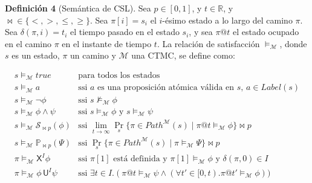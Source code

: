 \documentclass[runningheads]{llncs}
\begin{document}
\textbf{Definición 4} (Semántica de CSL). Sea $p \in [0,1]$, y $t \in \mathbb{R}$, y $\bowtie \in \{<, >, \leq, \geq\}$. Sea $\pi[i] = s_i$ el $i$-ésimo estado a lo largo del camino $\pi$. Sea $\delta(\pi, i) = t_i$ el tiempo pasado en el estado $s_i$, y sea $\pi@t$ el estado ocupado en el camino $\pi$ en el instante de tiempo $t$.
La relación de satisfacción $\models_\mathcal{M}$, donde $s$ es un estado, $\pi$ un camino y $\mathcal{M}$ una CTMC, se define como:

\[
\begin{array}{ll}
s \models_\mathcal{M} \mathit{true} & \text{para todos los estados} \\
s \models_\mathcal{M} a & \text{ssi $a$ es una proposición atómica válida en $s$, $a \in Label(s)$} \\
s \models_\mathcal{M} \neg \phi & \text{ssi } s \not\models_\mathcal{M} \phi \\
s \models_\mathcal{M} \phi \land \psi & \text{ssi } s \models_\mathcal{M} \phi \text{ y } s \models_\mathcal{M} \psi \\
s \models_\mathcal{M} \mathcal{S}_{\bowtie p}(\phi) & \text{ssi } \lim_{t \to \infty} \Pr_s\{\pi \in Path^\mathcal{M}(s) \mid \pi@t \models_\mathcal{M} \phi \} \bowtie p \\
s \models_\mathcal{M} \mathbb{P}_{\bowtie p}(\Psi) & \text{ssi } \Pr_s\{\pi \in Path^\mathcal{M}(s) \mid \pi \models_\mathcal{M} \Psi\} \bowtie p \\
\pi \models_\mathcal{M} \mathsf{X}^I \phi & \text{ssi } \pi[1] \text{ está definida y } \pi[1] \models_\mathcal{M} \phi \text{ y } \delta(\pi, 0) \in I \\
\pi \models_\mathcal{M} \phi \, \mathsf{U}^I \psi & \text{ssi } \exists t \in I. (\pi@t \models_\mathcal{M} \psi \land (\forall t' \in [0,t). \pi@t' \models_\mathcal{M} \phi))
\end{array}
\]
\end{document}
